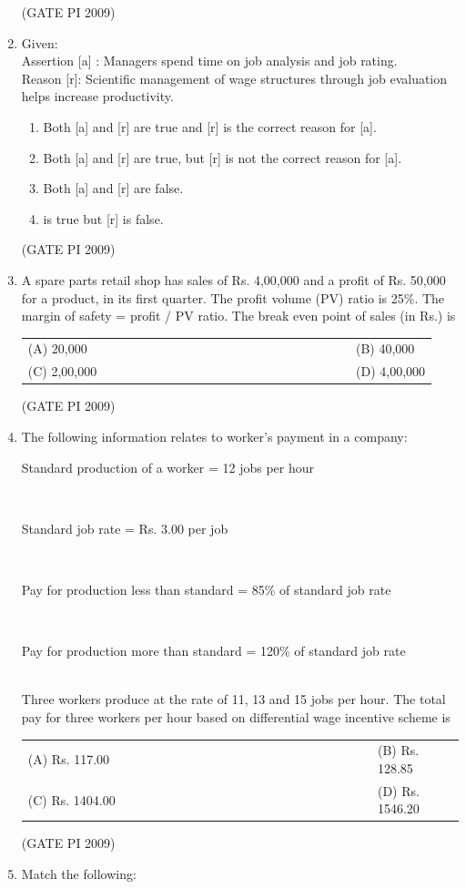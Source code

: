 \documentclass[journal,12pt,onecolumn]{IEEEtran}
\theoremstyle{remark}
\begin{document}
\begin{enumerate}[label=Q.\arabic*, leftmargin=*]
\hfill (GATE PI 2009)
\item Given: \\
Assertion [a] : Managers spend time on job analysis and job rating.\\
Reason [r]: Scientific management of wage structures through job evaluation helps increase productivity.
\begin{enumerate}[label=(\Alph*)]
\item Both [a] and [r] are true and [r] is the correct reason for [a].
\item Both [a] and [r] are true, but [r] is not the correct reason for [a].
\item Both [a] and [r] are false. 
\item \text[a] is true but [r] is false.
\end{enumerate}
\hfill (GATE PI 2009)
\item A spare parts retail shop has sales of Rs. 4,00,000 and a profit of Rs. 50,000 for a product, in its first quarter. The profit volume (PV) ratio is 25\%. The margin of safety = profit / PV ratio. The break even point of sales (in Rs.) is
\begin{multicols}{2}
\begin{tabular}[t]{p{0.8\linewidth} p{0.9\linewidth}}
(A) 20,000 & (B) 40,000 \\
(C) 2,00,000 & (D) 4,00,000 \\
\end{tabular}
\end{multicols}
\hfill (GATE PI 2009)
\item The following information relates to worker's payment in a company: \\
\centerline{Standard production of a worker = 12 jobs per hour} \\
\centerline{Standard job rate = Rs. 3.00 per job}\\
\centerline{Pay for production less than standard = 85\% of standard job rate}\\
\centerline{Pay for production more than standard = 120\% of standard job rate} \\
Three workers produce at the rate of 11, 13 and 15 jobs per hour. The total pay for three workers per hour based on differential wage incentive scheme is
\begin{multicols}{2}
\begin{tabular}[t]{p{0.8\linewidth} p{0.9\linewidth}}
(A) Rs. 117.00 & (B) Rs. 128.85 \\
(C) Rs. 1404.00 & (D) Rs. 1546.20 \\
\end{tabular}
\end{multicols}
\hfill (GATE PI 2009)
\item{Match the following:}


\end{enumerate}
\end{document}
